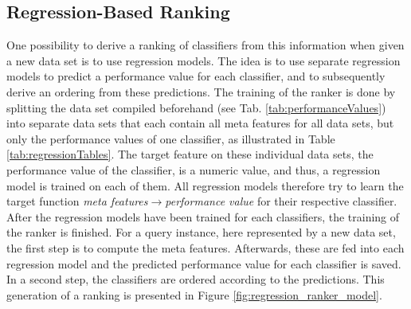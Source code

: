 \subsection{Regression-Based Ranking}
One possibility to derive a ranking of classifiers from this information when given a new data set is to use regression models. The idea is to use separate regression models to predict a performance value for each classifier, and to subsequently derive an ordering from these predictions. The training of the ranker is done by splitting the data set compiled beforehand (see Tab. \ref{tab:performanceValues}) into separate data sets that each contain all meta features for all data sets, but only the performance values of one classifier, as illustrated in Table \ref{tab:regressionTables}. The target feature on these individual data sets, the performance value of the classifier, is a numeric value, and thus, a regression model is trained on each of them. All regression models therefore try to learn the target function \textit{meta features}$\rightarrow$\textit{performance value} for their respective classifier. After the regression models have been trained for each classifiers, the training of the ranker is finished. For a query instance, here represented by a new data set, the first step is to compute the meta features. Afterwards, these are fed into each regression model and the predicted performance value for each classifier is saved. In a second step, the classifiers are ordered according to the predictions. This generation of a ranking is presented in Figure \ref{fig:regression_ranker_model}.

